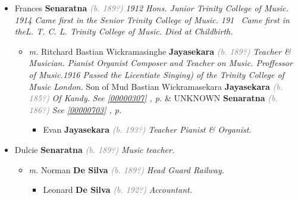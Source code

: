 \documentclass[10pt, openany]{book}
\begin{document}
\begin{itemize}
{\begin{itemize}
{\begin{itemize}
{\begin{itemize}
{\begin{itemize}
{\begin{itemize}
{ }
\end{itemize}}
\end{itemize}
 }
\item{Patrick \textbf{Abeykone} \textcolor{slorange}{\textit{(d. 1994)}} \textcolor{slmaroon}{\textit{See \footnote{\url{http://www.worldgenweb.org/lkawgw/gen3200.html.}}}}
 }
\end{itemize}}
\end{itemize}
 }
\item{Frances \textbf{Senaratna} \textcolor{gray}{\textit{(b. 189?)}} \textcolor{slmaroon}{\textit{1912 Hons. Junior Trinity College of Music. 1914 Came first in the Senior Trinity College of Music. 191~ Came first in theL. T. C. L. Trinity College of Music. Died at Childbirth.}}
\begin{itemize}
\item{\textit{m.} Ritchard Bastian Wickramasinghe \textbf{Jayasekara} \textcolor{gray}{\textit{(b. 189?)}} \textcolor{slmaroon}{\textit{Teacher \& Musician.
Pianist Organist Composer and Teacher on Music. Proffessor of Music.1916 Passed the Licentiate Singing) of the Trinity College of Music London.}} Son of  Mud Bastian Wickramasekara \textbf{Jayasekara} \textcolor{gray}{\textit{(b. 185?)}} \textcolor{slmaroon}{\textit{Of Kandy.}} \textcolor{slteal}{\textit{See  \autoref{00000307} \textit{, p. \pageref{00000307} }}}  \&  UNKNOWN \textbf{Senaratna} \textcolor{gray}{\textit{(b. 186?)}} \textcolor{slteal}{\textit{See  \autoref{00000703} \textit{, p. \pageref{00000703} }}}   \label{couple:00000312:00000726} \begin{itemize}
\item{Evan \textbf{Jayasekara} \textcolor{gray}{\textit{(b. 193?)}} \textcolor{slmaroon}{\textit{Teacher Pianist \& Organist.}}
 }
\end{itemize}}
\end{itemize}
 }
\item{Dulcie \textbf{Senaratna} \textcolor{gray}{\textit{(b. 189?)}} \textcolor{slmaroon}{\textit{Music teacher.}}
\begin{itemize}
\item{\textit{m.} Norman \textbf{De Silva} \textcolor{gray}{\textit{(b. 189?)}} \textcolor{slmaroon}{\textit{Head Guard Railway.}}   \label{couple:00000159:00000724} \begin{itemize}
\item{Leonard \textbf{De Silva} \textcolor{gray}{\textit{(b. 192?)}} \textcolor{slmaroon}{\textit{Accountant.}}
}
\end{itemize}}
\end{itemize}}
\end{itemize}}
\end{itemize}
\end{document}
